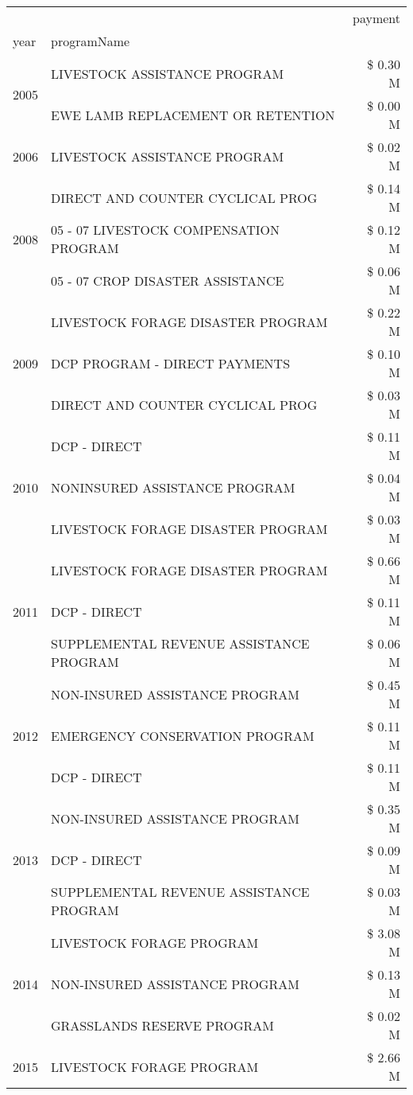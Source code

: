 \begin{tabular}{llr}
\toprule
 &  & payment \\
year & programName &  \\
\midrule
\multirow[t]{2}{*}{2005} & LIVESTOCK ASSISTANCE PROGRAM & \$ 0.30 M \\
 & EWE LAMB REPLACEMENT OR RETENTION & \$ 0.00 M \\
\cline{1-3}
2006 & LIVESTOCK ASSISTANCE PROGRAM & \$ 0.02 M \\
\cline{1-3}
\multirow[t]{3}{*}{2008} & DIRECT AND COUNTER CYCLICAL PROG & \$ 0.14 M \\
 & 05 - 07 LIVESTOCK COMPENSATION PROGRAM & \$ 0.12 M \\
 & 05 - 07 CROP DISASTER ASSISTANCE & \$ 0.06 M \\
\cline{1-3}
\multirow[t]{3}{*}{2009} & LIVESTOCK FORAGE DISASTER  PROGRAM & \$ 0.22 M \\
 & DCP PROGRAM - DIRECT PAYMENTS & \$ 0.10 M \\
 & DIRECT AND COUNTER CYCLICAL PROG & \$ 0.03 M \\
\cline{1-3}
\multirow[t]{3}{*}{2010} & DCP - DIRECT & \$ 0.11 M \\
 & NONINSURED ASSISTANCE PROGRAM & \$ 0.04 M \\
 & LIVESTOCK FORAGE DISASTER PROGRAM & \$ 0.03 M \\
\cline{1-3}
\multirow[t]{3}{*}{2011} & LIVESTOCK FORAGE DISASTER PROGRAM & \$ 0.66 M \\
 & DCP - DIRECT & \$ 0.11 M \\
 & SUPPLEMENTAL REVENUE ASSISTANCE PROGRAM & \$ 0.06 M \\
\cline{1-3}
\multirow[t]{3}{*}{2012} & NON-INSURED ASSISTANCE PROGRAM & \$ 0.45 M \\
 & EMERGENCY CONSERVATION PROGRAM & \$ 0.11 M \\
 & DCP - DIRECT & \$ 0.11 M \\
\cline{1-3}
\multirow[t]{3}{*}{2013} & NON-INSURED ASSISTANCE PROGRAM & \$ 0.35 M \\
 & DCP - DIRECT & \$ 0.09 M \\
 & SUPPLEMENTAL REVENUE ASSISTANCE PROGRAM & \$ 0.03 M \\
\cline{1-3}
\multirow[t]{3}{*}{2014} & LIVESTOCK FORAGE PROGRAM & \$ 3.08 M \\
 & NON-INSURED ASSISTANCE PROGRAM & \$ 0.13 M \\
 & GRASSLANDS RESERVE PROGRAM & \$ 0.02 M \\
\cline{1-3}
\multirow[t]{3}{*}{2015} & LIVESTOCK FORAGE PROGRAM & \$ 2.66 M \\

\end{tabular}
